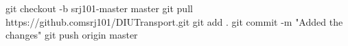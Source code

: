 git checkout -b srj101-master master
git pull https://github.comsrj101/DIUTransport.git
git add .
git commit -m "Added the changes"
git push origin master
